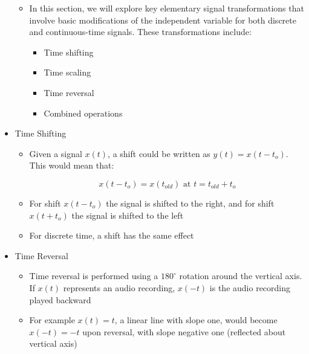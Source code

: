 \begin{itemize}
    \begin{itemize}

      \item In this section, we will explore key elementary signal transformations that involve basic modifications of the independent variable for both discrete and continuous-time signals. These transformations include:

        \begin{itemize}

          \item Time shifting

          \item Time scaling

          \item Time reversal

          \item Combined operations

        \end{itemize}

    \end{itemize}

  \item Time Shifting

    \begin{itemize}

      \item Given a signal $x(t)$, a shift could be written as $y(t)=x(t-t_o)$. This would mean that:

        $$x(t-t_o)=x(t_{old})\text{ at } t=t_{old}+t_o$$

      \item For shift $x(t-t_o)$ the signal is shifted to the right, and for shift $x(t+t_o)$ the signal is shifted to the left

      \item For discrete time, a shift has the same effect

    \end{itemize}

  \item Time Reversal

    \begin{itemize}

      \item Time reversal is performed using a $180^{\circ}$ rotation around the vertical axis. If $x(t)$ represents an audio recording, $x(-t)$ is the audio recording played backward

      \item For example $x(t)=t$, a linear line with slope one, would become $x(-t)=-t$ upon reversal, with slope negative one (reflected about vertical axis)


\end{itemize}
\end{itemize}

